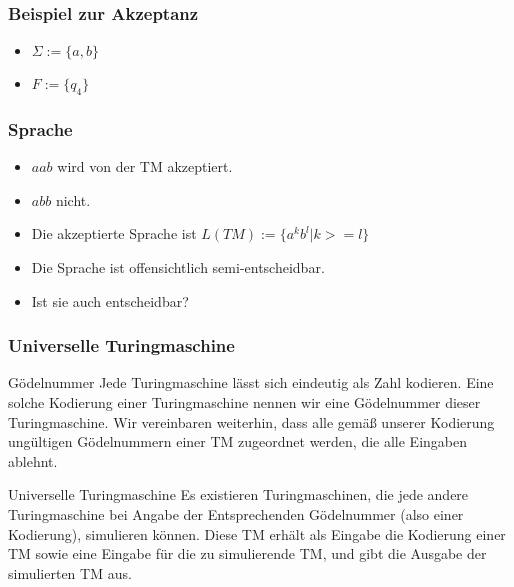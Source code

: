 \documentclass{beamer}
\begin{document}
\begin{frame}
 \frametitle{Beispiel zur Akzeptanz}
 \begin{itemize}
  \item $\Sigma := \{a, b\}$  
  \item $F := \{q_4\}$
 \end{itemize}
\vspace{-2cm}
 \end{frame}

\begin{frame}
 \frametitle{Sprache}
 \begin{itemize}
  \item $aab$ wird von der TM akzeptiert.
  \item $abb$ nicht.
  \item Die akzeptierte Sprache ist $L(TM) := \{a^kb^l| k >= l\}$
  \item Die Sprache ist offensichtlich semi-entscheidbar.
  \item Ist sie auch entscheidbar?
 \end{itemize}
\end{frame}



\begin{frame}
\frametitle{Universelle Turingmaschine}
\begin{block}{Gödelnummer}
Jede Turingmaschine lässt sich eindeutig als Zahl kodieren. Eine solche Kodierung einer Turingmaschine nennen wir eine Gödelnummer dieser Turingmaschine. Wir vereinbaren weiterhin, dass alle gemäß unserer Kodierung ungültigen Gödelnummern einer TM zugeordnet werden, die alle Eingaben ablehnt.
\end{block}
\begin{block}{Universelle Turingmaschine}
Es existieren Turingmaschinen, die jede andere Turingmaschine bei Angabe der Entsprechenden Gödelnummer (also einer Kodierung), simulieren können. Diese TM erhält als Eingabe die Kodierung einer TM sowie eine Eingabe für die zu simulierende TM, und gibt die Ausgabe der simulierten TM aus.
\end{block}
\end{frame}
\end{document}
